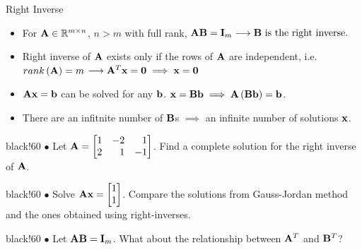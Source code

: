 \documentclass[aspectratio=169]{beamer}
\def\mf{\ensuremath\mathbf}
\def\mb{\ensuremath\mathbb}
\def\lp{\ensuremath\left(}
\def\rp{\ensuremath\right)}
\newcommand{\demoex}[2]{\onslide<#1->\begin{color}{black!60} #2 \end{color}}
\begin{document}
\begin{frame}[t]{Right Inverse}
\begin{itemize}
    \item For $\mf{A} \in \mb{R}^{m \times n}$, $n > m$ with full rank, $\mf{AB} = \mf{I}_m \longrightarrow \mf{B} \text{ is the right inverse.}$

    \item Right inverse of $\mf{A}$ exists only if the rows of $\mf{A}$ are independent, i.e. $rank\left(\mf{A}\right) = m$ $\longrightarrow \mf{A}^T\mf{x} = \mf{0} \implies \mf{x} = \mf{0}$

    \item $\mf{Ax} = \mf{b}$ can be solved for any $\mf{b}$. $\mf{x} = \mf{Bb} \implies \mf{A}\left(\mf{Bb}\right) = \mf{b}$. 

    \item There are an infitnite number of $\mf{B}$s $\implies$ an infinite number of solutions $\mf{x}$.
\end{itemize}
\vspace{0.2cm}

\demoex{2}{
    $\bullet$ Let $\mf{A} = \begin{bmatrix*}[r]1 & -2 & 1\\2 & 1 & -1\end{bmatrix*}$. Find a complete solution for the right inverse of $\mf{A}$.
}\vspace{0.2cm}

\demoex{3}{
    $\bullet$ Solve $\mf{A}\mf{x} = \begin{bmatrix*}[r]1 \\ 1\end{bmatrix*}$. Compare the solutions from Gauss-Jordan method and the ones obtained using right-inverses.
}\vspace{0.2cm}

\demoex{4}{
$\bullet$ Let $\mf{AB} = \mf{I}_m$. What about the relationship between $\mf{A}^T$ and $\mf{B}^T$?
}
\end{frame}


    
\end{document}
